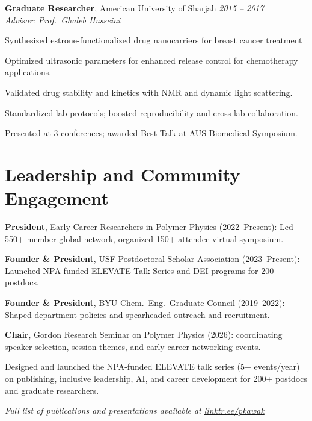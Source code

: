 \documentclass[letterpaper,12pt]{article}
\begin{document}
\textbf{Graduate Researcher}, American University of Sharjah \hfill \textit{2015 – 2017} \\
\textit{Advisor: Prof.~Ghaleb Husseini}
\begin{tabitemize}[leftmargin=*]
  \item Synthesized estrone-functionalized drug nanocarriers for breast cancer treatment
  \item Optimized ultrasonic parameters for enhanced release control for chemotherapy applications.
  \item Validated drug stability and kinetics with NMR and dynamic light scattering.
  \item Standardized lab protocols; boosted reproducibility and cross-lab collaboration.
  \item Presented at 3 conferences; awarded Best Talk at AUS Biomedical Symposium.
\end{tabitemize}

\section*{Leadership and Community Engagement}
\begin{tabitemize}[leftmargin=*]
  \item \textbf{President}, Early Career Researchers in Polymer Physics (2022–Present): Led 550+ member global network, organized 150+ attendee virtual symposium.
  \item \textbf{Founder \& President}, USF Postdoctoral Scholar Association (2023–Present): Launched NPA-funded ELEVATE Talk Series and DEI programs for 200+ postdocs.
  \item \textbf{Founder \& President}, BYU Chem.~Eng.~Graduate Council (2019–2022): Shaped department policies and spearheaded outreach and recruitment.
  \item \textbf{Chair}, Gordon Research Seminar on Polymer Physics (2026): coordinating speaker selection, session themes, and early-career networking events.
  \item Designed and launched the NPA-funded ELEVATE talk series (5+ events/year) on publishing, inclusive leadership, AI, and career development for 200+ postdocs and graduate researchers.
\end{tabitemize}

\begin{refsection}[articles]
  \nocite{*}
  \setlength\bibitemsep{0pt}
  \printbibliography[resetnumbers=true,type=article,title={Selected Peer-Reviewed Publications},heading=fix]
\end{refsection}
\noindent\textit{Full list of publications and presentations available at \href{https://linktr.ee/pkawak}{linktr.ee/pkawak}}
\end{document}
